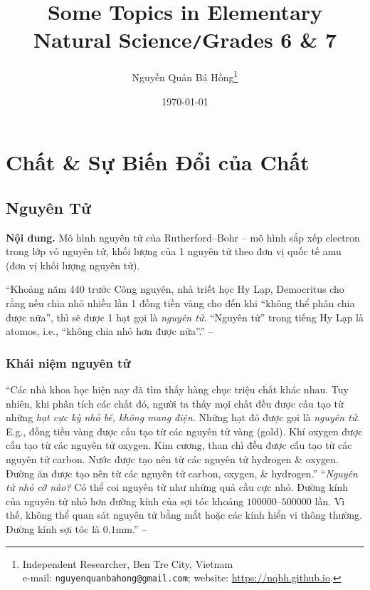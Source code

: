 \documentclass{article}
\title{Some Topics in Elementary Natural Science\texttt{/}Grades 6 \& 7}
\author{Nguyễn Quản Bá Hồng\footnote{Independent Researcher, Ben Tre City, Vietnam\\e-mail: \texttt{nguyenquanbahong@gmail.com}; website: \url{https://nqbh.github.io}.}}
\date{\today}
\numberwithin{equation}{section}
\begin{document}
\maketitle
\begin{abstract}
	
\end{abstract}
\setcounter{secnumdepth}{4}
\setcounter{tocdepth}{3}
\tableofcontents
\newpage


\section{Chất \& Sự Biến Đổi của Chất}

\subsection{Nguyên Tử}
\textsf{\textbf{Nội dung.} Mô hình nguyên tử của Rutherford--Bohr -- mô hình sắp xếp electron trong lớp vỏ nguyên tử, khối lượng của 1 nguyên tử theo đơn vị quốc tế amu (đơn vị khối lượng nguyên tử).}

``Khoảng năm 440 trước Công nguyên, nhà triết học Hy Lạp, Democritus cho rằng nếu chia nhỏ nhiều lần 1 đồng tiền vàng cho đến khi ``không thể phân chia được nữa'', thì sẽ được 1 hạt gọi là \textit{nguyên tử}. ``Nguyên tử'' trong tiếng Hy Lạp là atomos, i.e., ``không chia nhỏ hơn được nữa''.'' -- \cite[p. 10]{SGK_KHTN_7_Canh_Dieu}

\subsubsection{Khái niệm nguyên tử}
``Các nhà khoa học hiện nay đã tìm thấy hàng chục triệu chất khác nhau. Tuy nhiên, khi phân tích các chất đó, người ta thấy mọi chất đều được cấu tạo từ những \textit{hạt cực kỳ nhỏ bé, không mang điện}. Những hạt đó được gọi là \textit{nguyên tử}. E.g., đồng tiền vàng được cấu tạo từ các nguyên tử vàng (gold). Khí oxygen được cấu tạo từ các nguyên tử oxygen. Kim cương, than chì đều được cấu tạo từ các nguyên tử carbon. Nước được tạo nên từ các nguyên tử hydrogen \& oxygen. Đường ăn được tạo nên từ các nguyên tử carbon, oxygen, \& hydrogen.'' ``\textit{Nguyên tử nhỏ cỡ nào?} Có thể coi nguyên tử như những quả cầu cực nhỏ. Đường kính của nguyên tử nhỏ hơn đường kính của sợi tóc khoảng $100000$--$500000$ lần. Vì thế, không thể quan sát nguyên tử bằng mắt hoặc các kính hiển vi thông thường. Đường kính sợi tóc là $0.1$mm.'' -- \cite[p. 10]{SGK_KHTN_7_Canh_Dieu}
\end{document}

